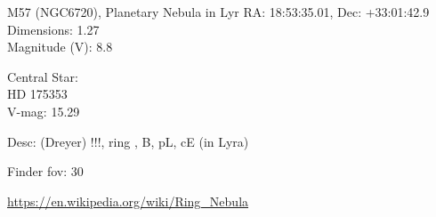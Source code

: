 \begin{block}{M57 (NGC6720), Planetary Nebula in Lyr}
    RA: 18:53:35.01, Dec: +33:01:42.9 \\ 
    Dimensions: 1.27 \\ 
    Magnitude (V): 8.8

    Central Star: \\ 
      \hspace{1em}HD 175353 \\ 
      \hspace{1em}V-mag: 15.29 

    Desc: (Dreyer) !!!, ring , B, pL, cE (in Lyra) 

    Finder fov: 30 

    \url{https://en.wikipedia.org/wiki/Ring_Nebula} 
\end{block}